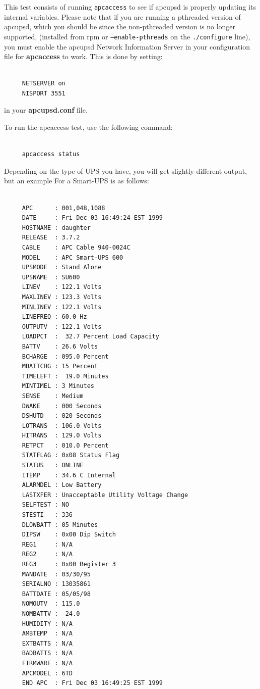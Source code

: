 \label{index-Testing_002c-apcaccess-89}
\label{index-apcaccess-Test-90}
This test consists of running {\tt apcaccess} to see if apcupsd is properly
updating its internal variables.  Please note that if you are running a
pthreaded version of apcupsd, which you should be since the non-pthreaded
version is no longer supported, (installed from rpm or {\tt --enable-pthreads}
on the {\tt ./configure} line), you must enable the apcupsd Network
Information Server in your configuration file for {\bf apcaccess} to work. 
This is done by setting: 

\footnotesize
\begin{verbatim}
     
     NETSERVER on
     NISPORT 3551
\end{verbatim}
\normalsize

in your {\bf apcupsd.conf} file.  

To run the apcaccess test, use the following command: 

\footnotesize
\begin{verbatim}
     
     apcaccess status
\end{verbatim}
\normalsize

Depending on the type of UPS you have, you will get slightly different output,
but an example For a Smart-UPS is as follows: 

\footnotesize
\begin{verbatim}
     
     APC      : 001,048,1088
     DATE     : Fri Dec 03 16:49:24 EST 1999
     HOSTNAME : daughter
     RELEASE  : 3.7.2
     CABLE    : APC Cable 940-0024C
     MODEL    : APC Smart-UPS 600
     UPSMODE  : Stand Alone
     UPSNAME  : SU600
     LINEV    : 122.1 Volts
     MAXLINEV : 123.3 Volts
     MINLINEV : 122.1 Volts
     LINEFREQ : 60.0 Hz
     OUTPUTV  : 122.1 Volts
     LOADPCT  :  32.7 Percent Load Capacity
     BATTV    : 26.6 Volts
     BCHARGE  : 095.0 Percent
     MBATTCHG : 15 Percent
     TIMELEFT :  19.0 Minutes
     MINTIMEL : 3 Minutes
     SENSE    : Medium
     DWAKE    : 000 Seconds
     DSHUTD   : 020 Seconds
     LOTRANS  : 106.0 Volts
     HITRANS  : 129.0 Volts
     RETPCT   : 010.0 Percent
     STATFLAG : 0x08 Status Flag
     STATUS   : ONLINE
     ITEMP    : 34.6 C Internal
     ALARMDEL : Low Battery
     LASTXFER : Unacceptable Utility Voltage Change
     SELFTEST : NO
     STESTI   : 336
     DLOWBATT : 05 Minutes
     DIPSW    : 0x00 Dip Switch
     REG1     : N/A
     REG2     : N/A
     REG3     : 0x00 Register 3
     MANDATE  : 03/30/95
     SERIALNO : 13035861
     BATTDATE : 05/05/98
     NOMOUTV  : 115.0
     NOMBATTV :  24.0
     HUMIDITY : N/A
     AMBTEMP  : N/A
     EXTBATTS : N/A
     BADBATTS : N/A
     FIRMWARE : N/A
     APCMODEL : 6TD
     END APC  : Fri Dec 03 16:49:25 EST 1999
\end{verbatim}
\normalsize

